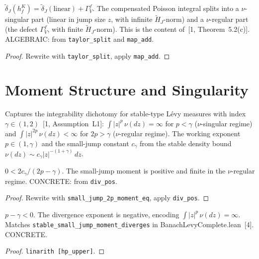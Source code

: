 \begin{theorem}\label{thm:two_regime_decomposition}
\leanok
{}
$\tilde{\delta}_J(h_f^K) = \tilde{\delta}_J(\text{linear}) + \Gamma_V^f$. The compensated Poisson integral splits into a $\nu$-singular part (linear in jump size $z$, with infinite $\tilde{H}_J$-norm) and a $\nu$-regular part (the defect $\Gamma_V^f$, with finite $\tilde{H}_J$-norm). This is the content of~[1, Theorem~5.2(c)]. ALGEBRAIC: from \texttt{taylor\_split} and \texttt{map\_add}.
\end{theorem}
\begin{proof}\leanok Rewrite with \texttt{taylor\_split}, apply \texttt{map\_add}.\end{proof}

\section{Moment Structure and Singularity}

\begin{defn}\label{def:NuMomentStructure}
\leanok
Captures the integrability dichotomy for stable-type L\'evy measures with index $\gamma \in (1,2)$~[1, Assumption~L1]: $\int |z|^p\,\nu(dz) = \infty$ for $p < \gamma$ ($\nu$-singular regime) and $\int |z|^{2p}\,\nu(dz) < \infty$ for $2p > \gamma$ ($\nu$-regular regime). The working exponent $p \in (1,\gamma)$ and the small-jump constant $c_\gamma$ from the stable density bound $\nu(dz) \sim c_\gamma |z|^{-(1+\gamma)}\,dz$.
\end{defn}

\begin{theorem}\label{thm:small_jump_2p_moment_pos}
\leanok
{}
$0 < 2c_\gamma / (2p - \gamma)$. The small-jump moment is positive and finite in the $\nu$-regular regime. CONCRETE: from \texttt{div\_pos}.
\end{theorem}
\begin{proof}\leanok Rewrite with \texttt{small\_jump\_2p\_moment\_eq}, apply \texttt{div\_pos}.\end{proof}

\begin{theorem}\label{thm:p_moment_divergence_exponent}
\leanok
{}
$p - \gamma < 0$. The divergence exponent is negative, encoding $\int |z|^p\,\nu(dz) = \infty$. Matches \texttt{stable\_small\_jump\_moment\_diverges} in BanachLevyComplete.lean~[4]. CONCRETE.
\end{theorem}
\begin{proof}\leanok \texttt{linarith [hp\_upper]}.\end{proof}

